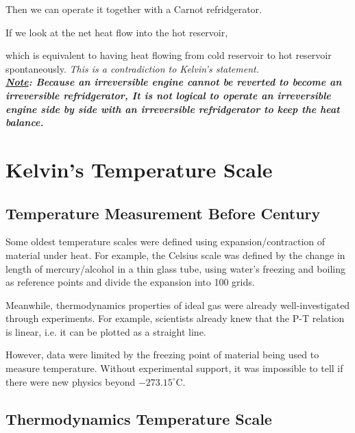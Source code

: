 \documentclass[class=article, crop=false, 12pt]{standalone}
\begin{document}
\begin{enumerate}
    Then we can operate it together with a Carnot refridgerator.


    If we look at the net heat flow into the hot reservoir,

    which is equivalent to having heat flowing from cold reservoir to hot reservoir spontaneously.
    \it{This is a contradiction to Kelvin's statement}.\\

    \bf{\ul{Note}}: Because an irreversible engine cannot be reverted to become an irreversible refridgerator,
    It is not logical to operate an irreversible engine side by side with an irreversible refridgerator to keep the heat balance.

   

\end{enumerate}



\linesep
\section{Kelvin's Temperature Scale}

\subsection{Temperature Measurement Before  Century}

Some oldest temperature scales were defined using expansion/contraction of material under heat.
For example, the Celsius scale was defined by the change in length of mercury/alcohol in a thin glass tube,
using water's freezing and boiling as reference points and divide the expansion into 100 grids.


Meanwhile, thermodynamics properties of ideal gas were already well-investigated through experiments.
For example, scientists already knew that the P-T relation is linear,
i.e. it can be plotted as a straight line.


However, data were limited by the freezing point of material being used to measure temperature.
Without experimental support, it was impossible to tell if there were new physics beyond $-273.15^\circ$C.


\subsection{Thermodynamics Temperature Scale}
\end{document}
